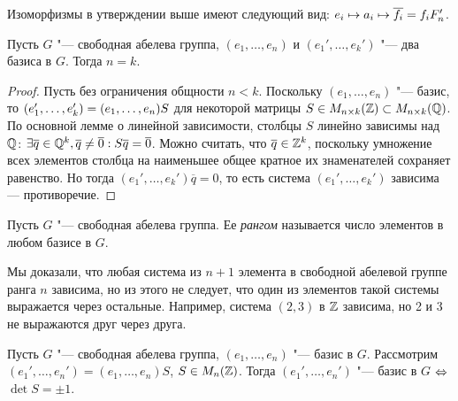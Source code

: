 \begin{note}
	Изоморфизмы в утверждении выше имеют следующий вид: $e_i \mapsto a_i \mapsto \overline{f_i} \hm= f_iF_n'$.
\end{note}

\begin{theorem}
	Пусть $G$ "--- свободная абелева группа, $(e_1, \dotsc, e_n)$ и $(e_1', \dotsc, e_k')$ "--- два базиса в $G$. Тогда $n = k$.
\end{theorem}

\begin{proof}
	Пусть без ограничения общности $n < k$. Поскольку $(e_1, \dotsc, e_n)$ "--- базис, то $(e_1', \dotsc, e_k') \hm= (e_1, \dotsc, e_n)S$ для некоторой матрицы $S \in M_{n \times k}(\mathbb{Z}) \subset M_{n \times k}(\mathbb{Q})$. По основной лемме о линейной зависимости, столбцы $S$ линейно зависимы над $\mathbb{Q}$: $\exists \overline{q} \in \mathbb{Q}^k, \overline{q} \ne \overline{0}: S\overline{q} = \overline{0}$. Можно считать, что $\overline{q} \in \mathbb{Z}^k$, поскольку умножение всех элементов столбца на наименьшее общее кратное их знаменателей сохраняет равенство. Но тогда $(e_1', \dotsc, e_k')\overline{q} = 0$, то есть система $(e_1', \dotsc, e_k')$ зависима --- противоречие.
\end{proof}

\begin{definition}
	Пусть $G$ "--- свободная абелева группа. Ее \textit{рангом} называется число элементов в любом базисе в $G$.
\end{definition}

\begin{note}
	Мы доказали, что любая система из $n+1$ элемента в свободной абелевой группе ранга $n$ зависима, но из этого не следует, что один из элементов такой системы выражается через остальные. Например, система $(2, 3)$ в $\mathbb{Z}$ зависима, но 2 и 3 не выражаются друг через друга.
\end{note}

\begin{theorem}
	Пусть $G$ "--- свободная абелева группа, $(e_1, \dotsc, e_n)$ "--- базис в $G$. Рассмотрим $(e_1', \dotsc, e_n') = (e_1, \dotsc, e_n)S$, $S \in M_n(\mathbb{Z})$. Тогда $(e_1', \dotsc, e_n')$ "--- базис в $G$ $\Leftrightarrow$ $\det{S} = \pm1$.
\end{theorem}

